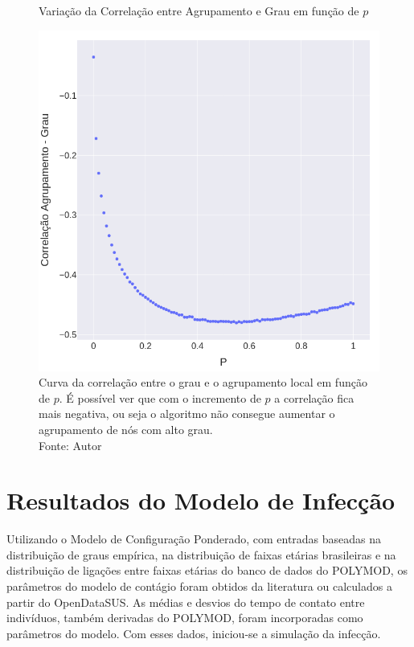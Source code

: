 \begin{figure}[H]
    \centering
    \captionsetup{font=normalsize,skip=0.8pt,singlelinecheck=on,labelsep=endash}
    \caption{Variação da Correlação entre Agrupamento e Grau em função de $p$}
    \includegraphics[scale= 0.45]{figuras/correlation.png}
    \captionsetup{font=small,justification=justified}   
    \caption*{Curva da correlação entre o grau e o agrupamento local em função de $p$. É possível ver que com o incremento de $p$ a correlação fica mais negativa, ou seja o algoritmo não consegue aumentar o agrupamento de nós com alto grau.\\Fonte: Autor}
    \label{fig:correlation}
\end{figure}

\section{Resultados do Modelo de Infecção}

Utilizando o Modelo de Configuração Ponderado, com entradas baseadas na distribuição de graus empírica, na distribuição de faixas etárias brasileiras e na distribuição de ligações entre faixas etárias do banco de dados do POLYMOD, os parâmetros do modelo de contágio foram obtidos da literatura ou calculados a partir do OpenDataSUS. As médias e desvios do tempo de contato entre indivíduos, também derivadas do POLYMOD, foram incorporadas como parâmetros do modelo. Com esses dados, iniciou-se a simulação da infecção.

